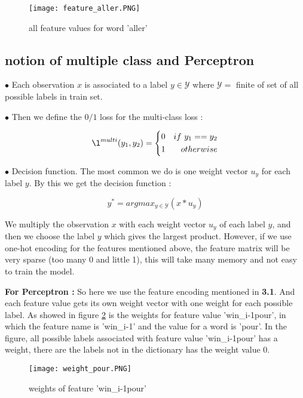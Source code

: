 \documentclass{article}
\def\YY{{\mathcal{Y}}}
\begin{document}
\begin{figure}[ht]
\centering
\texttt{[image: feature\_aller.PNG]}
\caption{all feature values for word 'aller'}
\label{figure1}
\end{figure}

\subsection{notion of multiple class and Perceptron}
$\bullet$ Each observation $x$ is associated to a label $y \in \YY$ where $\YY = $ finite of set of all possible labels in train set. 

$\bullet$ Then we define the $0/1$ loss for the multi-class loss : 

\begin{equation}
\l^{multi}(y_1, y_2) = \left\{
\begin{aligned}
0 & & if\ y_1 == y_2\\
1 & &otherwise
\end{aligned}
\right.
\end{equation}

$\bullet$ Decision function. The most common we do is one weight vector $u_y$ for each label $y$. By this we get the decision function :

\begin{equation}
y^* = argmax_{y \in \YY} (x*u_y)
\end{equation}

We multiply the observation $x$ with each weight vector $u_y$ of each label $y$, and then we choose the label $y$ which gives the largest product. However, if we use one-hot encoding for the features mentioned above, the feature matrix will be very sparse (too many 0 and little 1), this will take many memory and not easy to train the model.

\textbf{For Perceptron : } So here we use the feature encoding mentioned in \textbf{3.1}. And each feature value gets its own weight vector with one weight for each possible label. As showed in figure \ref{figure2} is the weights for feature value 'win\_i-1pour', in which the feature name is 'win\_i-1' and the value for a word is 'pour'. In the figure, all possible labels associated with feature value 'win\_i-1pour' has a weight, there are the labels not in the dictionary has the weight value 0.

\begin{figure}[ht]
\centering
\texttt{[image: weight\_pour.PNG]}
\caption{weights of feature 'win\_i-1pour'}
\label{figure2}
\end{figure}
\end{document}

